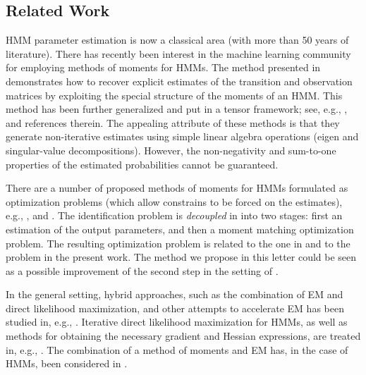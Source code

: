 \documentclass[journal]{IEEEtran}
\begin{document}
\subsection*{Related Work}
\label{sec:related_work}

HMM parameter estimation is now a classical area (with more than 50 years of literature).
There has recently been interest in the machine learning community for employing methods
of moments for HMMs.  The method presented in \cite[Appendix A]{hsu_spectral_2012}
demonstrates how to recover explicit estimates of the transition and observation matrices
by exploiting the special structure of the moments of an HMM. This method has been further
generalized and put in a tensor framework; see, e.g., \cite{anandkumar_method_2012},
\cite{anandkumar_tensor_2014} and references therein. The appealing attribute of these
methods is that they generate non-iterative estimates using simple linear algebra
operations (eigen and singular-value decompositions). However, the non-negativity and
sum-to-one properties of the estimated probabilities cannot be guaranteed.

There are a number of proposed methods of moments for HMMs formulated as
optimization problems (which allow constrains to be forced on the estimates),
e.g., \cite{lakshminarayanan_non-negative_2010},
\cite{kontorovich_learning_2013} and \cite{subakan_method_2015}.  The identification problem is \emph{decoupled} in
\cite{kontorovich_learning_2013} into two stages: first an estimation of the
output parameters, and then a moment matching optimization problem. The
resulting optimization problem is related to the one in
\cite{lakshminarayanan_non-negative_2010} and to the problem in the present work. The
method we propose in this letter could be seen as a possible improvement of the
second step in the setting of \cite{kontorovich_learning_2013}.

In the general setting, hybrid approaches, such as the combination of EM and
direct likelihood maximization, and other attempts to accelerate EM has been
studied in, e.g., \cite{meilijson_fast_1989,fessler_space-alternating_1994}.
Iterative direct likelihood maximization for HMMs, as well as methods for
obtaining the necessary gradient and Hessian expressions, are treated in, e.g.,
\cite{lystig_exact_2002, cappe_recursive_2005, cappe_inference_2005,
turner_direct_2008, khreich_survey_2012, macdonald_numerical_2014}. The
combination of a method of moments and EM has, in the case of HMMs, been
considered in \cite{kontorovich_learning_2013}. 
\end{document}
